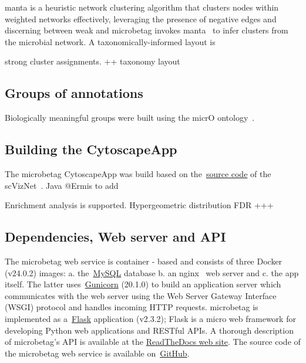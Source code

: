 \documentclass[sn-mathphys,Numbered]{sn-jnl}%
\theoremstyle{thmstyleone}%
\theoremstyle{thmstyletwo}%
\theoremstyle{thmstylethree}%
\begin{document}
        manta is a heuristic network clustering algorithm that clusters nodes within weighted networks effectively, leveraging the presence of negative edges and discerning between weak and 
        microbetag invokes manta~\cite{rottjers2020manta} to infer clusters from the microbial network.
        A taxonomically-informed layout is 

        strong cluster assignments.
        ++ taxonomy layout 
        




    \subsection*{ Groups of annotations }
        \label{groups}

    Biologically meaningful groups were built using the micrO ontology~\cite{blank2016micro}.





    \subsection*{ Building the CytoscapeApp }
        \label{subsec:build-cytoapp}
        The microbetag CytoscapeApp was build based on the~\href{https://github.com/RBVI/scNetViz}{source code} of the scVizNet~\cite{choudhary2021scnetviz}.
        Java 
        @Ermis to add 
        

        Enrichment analysis is supported. 
        Hypergeometric distribution
        FDR +++




    \subsection*{ Dependencies, Web server and API }
        \label{subsec:webserver}

        The microbetag web service is container - based and consists of three Docker~\cite{merkel2014docker} (v24.0.2) images: 
        a. the~\href{https://www.mysql.com}{MySQL} database 
        b. an nginx~\cite{nginx} web server and 
        c. the app itself. 
        The latter uses~\href{https://gunicorn.org}{Gunicorn} (20.1.0) to build an application server which communicates with the web server using the Web Server Gateway Interface (WSGI) protocol and handles incoming HTTP requests.
        microbetag is implemented as a~\href{https://flask.palletsprojects.com/en/3.0.x/}{Flask} application (v2.3.2); Flask is 
        a micro web framework for developing Python web applications and RESTful APIs. 
        A thorough description of microbetag's API is available at the \href{https://hariszaf.github.io/microbetag/docs/api/}{ReadTheDocs web site}. 
        The source code of the microbetag web service is available on~\href{https://github.com/msysbio/microbetagApp/}{GitHub}.
\end{document}

